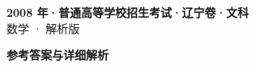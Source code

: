 \documentclass[zihao=-4, a4paper]{ctexart}
\begin{document}
\begin{center}
  {\Large\bfseries 2008 年·普通高等学校招生考试·辽宁卷·文科}\\[4pt]
  {\large 数学 · 解析版}
\end{center}
\medskip
{}

\clearpage
{}
\begin{center}{\Large\bfseries 参考答案与详细解析}\end{center}
\medskip

\end{document}
